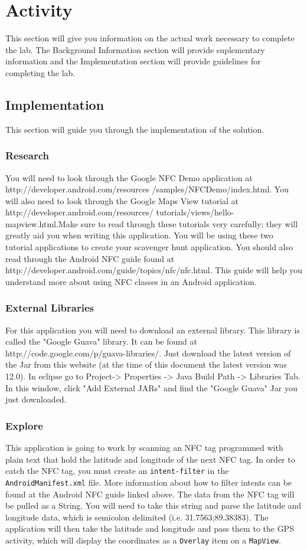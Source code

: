 \section{Activity}
This section will give you information on the actual work necessary to complete the lab. The Background Information section will provide suplementary information and the Implementation section will provide guidelines for completing the lab.
\subsection{Implementation}
This section will guide you through the implementation of the solution.
\subsubsection{Research}
You will need to look through the Google NFC Demo application at 
http://developer.android.com/resources /samples/NFCDemo/index.html.
You will also need to look through the Google Maps View tutorial at http://developer.android.com/resources/ tutorials/views/hello-mapview.html.Make sure to read through these tutorials very carefully; they will greatly aid you when writing this application.
You will be using these two tutorial applications to create your scavenger hunt application.
You should also read through the Android NFC guide found at 
http://developer.android.com/guide/topics/nfc/nfc.html.
This guide will help you understand more about using NFC classes in an Android application.

\subsubsection{External Libraries}
For this application you will need to download an external library.
This library is called the "Google Guava" library.
It can be found at http://code.google.com/p/guava-libraries/.
Just download the latest version of the Jar from this website (at the time of this document the latest version was 12.0).
In eclipse go to Project-> Properties -> Java Build Path -> Libraries Tab.
In this window, click "Add External JARs" and find the "Google Guava" Jar you just downloaded.

\subsubsection{Explore}
This application is going to work by scanning an NFC tag programmed with plain text that hold the latitude and longitude of the next NFC tag.
In order to catch the NFC tag, you must create an \verb=intent-filter= in the \verb=AndroidManifest.xml= file.
More information about how to filter intents can be found at the Android NFC guide linked above.
The data from the NFC tag will be pulled as a String.
You will need to take this string and parse the latitude and longitude data, which is semicolon delimited (i.e. 31.7563;89.38383).
The application will then take the latitude and longitude and pass them to the GPS activity, which will display the coordinates as a \verb=Overlay= item on a \verb=MapView=.
